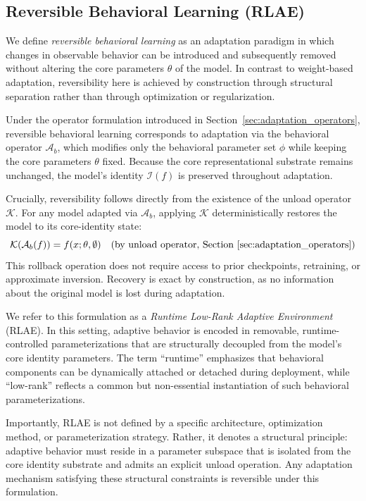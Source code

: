 \documentclass[10pt]{article}
\begin{document}
	
	\subsection{Reversible Behavioral Learning (RLAE)}
	\label{sec:rlae}
	
	We define \emph{reversible behavioral learning} as an adaptation paradigm in which changes in observable behavior can be introduced and subsequently removed without altering the core parameters $\theta$ of the model. In contrast to weight-based adaptation, reversibility here is achieved by construction through structural separation rather than through optimization or regularization.
	
	Under the operator formulation introduced in Section~\ref{sec:adaptation_operators}, reversible behavioral learning corresponds to adaptation via the behavioral operator $\mathcal{A}_b$, which modifies only the behavioral parameter set $\phi$ while keeping the core parameters $\theta$ fixed. Because the core representational substrate remains unchanged, the model’s identity $\mathcal{I}(f)$ is preserved throughout adaptation.
	
	Crucially, reversibility follows directly from the existence of the unload operator $\mathcal{K}$. For any model adapted via $\mathcal{A}_b$, applying $\mathcal{K}$ deterministically restores the model to its core-identity state:
	\[
	\mathcal{K}(\mathcal{A}_b(f)) = f(x;\theta,\emptyset)
	\quad \text{(by unload operator, Section~\ref{sec:adaptation_operators})}
	\]
	This rollback operation does not require access to prior checkpoints, retraining, or approximate inversion. Recovery is exact by construction, as no information about the original model is lost during adaptation.
	
	We refer to this formulation as a \emph{Runtime Low-Rank Adaptive Environment} (RLAE). In this setting, adaptive behavior is encoded in removable, runtime-controlled parameterizations that are structurally decoupled from the model's core identity parameters. The term “runtime” emphasizes that behavioral components can be dynamically attached or detached during deployment, while “low-rank” reflects a common but non-essential instantiation of such behavioral parameterizations.
	
	Importantly, RLAE is not defined by a specific architecture, optimization method, or parameterization strategy. Rather, it denotes a structural principle: adaptive behavior must reside in a parameter subspace that is isolated from the core identity substrate and admits an explicit unload operation. Any adaptation mechanism satisfying these structural constraints is reversible under this formulation.
	
\end{document}

